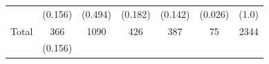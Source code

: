 \documentclass[11pt,a4paper,openany]{book}
\begin{document}
\begin{longtable}[]{@{}lcccccc@{}}
\begin{minipage}[t]{0.13\columnwidth}
\strut
\end{minipage} & \begin{minipage}[t]{0.15\columnwidth}\centering\strut
(0.156)\strut
\end{minipage} & \begin{minipage}[t]{0.09\columnwidth}\centering\strut
(0.494)\strut
\end{minipage} & \begin{minipage}[t]{0.15\columnwidth}\centering\strut
(0.182)\strut
\end{minipage} & \begin{minipage}[t]{0.10\columnwidth}\centering\strut
(0.142)\strut
\end{minipage} & \begin{minipage}[t]{0.10\columnwidth}\centering\strut
(0.026)\strut
\end{minipage} & \begin{minipage}[t]{0.07\columnwidth}\centering\strut
(1.0)\strut
\end{minipage}\tabularnewline
\begin{minipage}[t]{0.13\columnwidth}\raggedright\strut
Total\strut
\end{minipage} & \begin{minipage}[t]{0.15\columnwidth}\centering\strut
366\strut
\end{minipage} & \begin{minipage}[t]{0.09\columnwidth}\centering\strut
1090\strut
\end{minipage} & \begin{minipage}[t]{0.15\columnwidth}\centering\strut
426\strut
\end{minipage} & \begin{minipage}[t]{0.10\columnwidth}\centering\strut
387\strut
\end{minipage} & \begin{minipage}[t]{0.10\columnwidth}\centering\strut
75\strut
\end{minipage} & \begin{minipage}[t]{0.07\columnwidth}\centering\strut
2344\strut
\end{minipage}\tabularnewline
\begin{minipage}[t]{0.13\columnwidth}\raggedright\strut
\strut
\end{minipage} & \begin{minipage}[t]{0.15\columnwidth}\centering\strut
(0.156)\strut
\end{minipage} & \begin{minipage}[t]{0.09\columnwidth}\centering\strut

\end{minipage}
\end{longtable}
\end{document}
